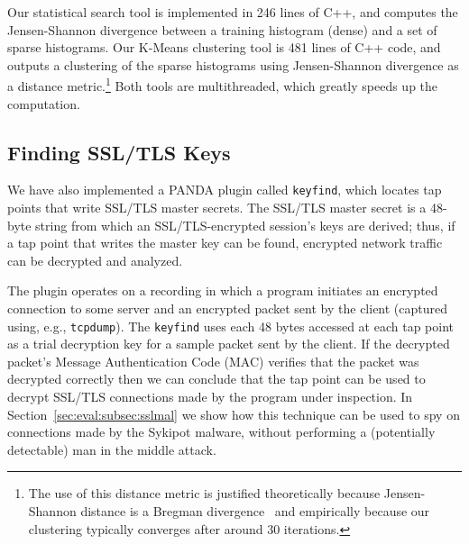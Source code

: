 Our statistical search tool is implemented in 246 lines of C++, and
computes the Jensen-Shannon divergence between a training histogram
(dense) and a set of sparse histograms. Our K-Means clustering tool is
481 lines of C++ code, and outputs a clustering of the sparse histograms
using Jensen-Shannon divergence as a distance metric.\footnote{The use
of this distance metric is justified theoretically because
Jensen-Shannon distance is a Bregman divergence~\cite{Banerjee:2005qf}
and empirically because our clustering typically converges after around
30 iterations.} Both tools are multithreaded, which greatly speeds up the
computation.

\subsection{Finding SSL/TLS Keys}
\label{sec:implementation:subsec:keyfind}

We have also implemented a PANDA plugin called \texttt{keyfind}, which
locates tap points that write SSL/TLS master secrets. The SSL/TLS master
secret is a 48-byte string from which an SSL/TLS-encrypted session's
keys are derived; thus, if a tap point that writes the master key can be
found, encrypted network traffic can be decrypted and analyzed.

The plugin operates on a recording in which a program initiates an
encrypted connection to some server and an encrypted packet sent by the
client (captured using, e.g., \texttt{tcpdump}). The \texttt{keyfind}
uses each 48 bytes accessed at each tap point as a trial decryption key
for a sample packet sent by the client. If the decrypted packet's
Message Authentication Code (MAC) verifies that the packet was decrypted
correctly then we can conclude that the tap point can be used to decrypt
SSL/TLS connections made by the program under inspection. In
Section~\ref{sec:eval:subsec:sslmal} we show how this technique can be
used to spy on connections made by the Sykipot malware, without
performing a (potentially detectable) man in the middle attack.
